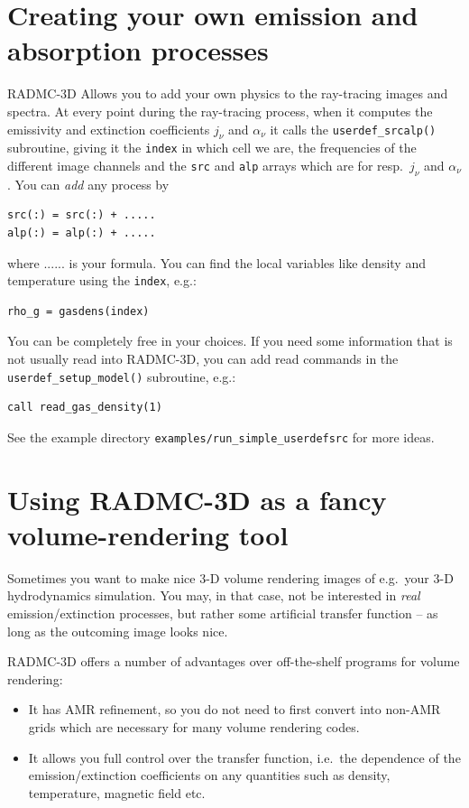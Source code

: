 \documentclass{report}
\newenvironment{asciibox}%
  {\begin{list}{}{%
    \setlength{\topsep}{0.5em}%
    \setlength{\parskip}{0em}%
    \setlength{\parsep}{0em}%
    \setlength{\itemsep}{0em}%
    \setlength{\rightmargin}{0em}%
    \setlength{\leftmargin}{3.0em}%
    \setlength{\labelsep}{1em}%
    \setlength{\labelwidth}{2em}%
  }\normalfont\footnotesize\item}
  {\end{list}}
\begin{document}
\section{Creating your own emission and absorption processes}
RADMC-3D Allows you to add your own physics to the ray-tracing images and
spectra. At every point during the ray-tracing process, when it computes the
emissivity and extinction coefficients $j_\nu$ and $\alpha_\nu$ it calls the
{\small\tt userdef\_srcalp()} subroutine, giving it the {\small\tt index} in
which cell we are, the frequencies of the different image channels and the
{\small\tt src} and {\small\tt alp} arrays which are for resp.\ $j_\nu$ and
$\alpha_\nu$. You can {\em add} any process by
\begin{asciibox}\begin{verbatim}
src(:) = src(:) + .....
alp(:) = alp(:) + .....
\end{verbatim}\end{asciibox}
where ...... is your formula. You can find the local variables like 
density and temperature using the {\small\tt index}, e.g.:
\begin{asciibox}\begin{verbatim}
rho_g = gasdens(index)
\end{verbatim}\end{asciibox}
You can be completely free in your choices. If you need some information
that is not usually read into RADMC-3D, you can add read commands in the
{\small\tt userdef\_setup\_model()} subroutine, e.g.:
\begin{asciibox}\begin{verbatim}
call read_gas_density(1)
\end{verbatim}\end{asciibox}

See the example directory {\small\tt examples/run\_simple\_userdefsrc} for
more ideas.

\section{Using RADMC-3D as a fancy volume-rendering tool}
Sometimes you want to make nice 3-D volume rendering images of e.g.\ your
3-D hydrodynamics simulation. You may, in that case, not be interested in
{\em real} emission/extinction processes, but rather some artificial
transfer function -- as long as the outcoming image looks nice. 

RADMC-3D offers a number of advantages over off-the-shelf programs for
volume rendering:
\begin{itemize}
\item It has AMR refinement, so you do not need to first convert into
  non-AMR grids which are necessary for many volume rendering codes.
\item It allows you full control over the transfer function, i.e.\ the
  dependence of the emission/extinction coefficients on any quantities
  such as density, temperature, magnetic field etc.
\end{itemize}
\end{document}
